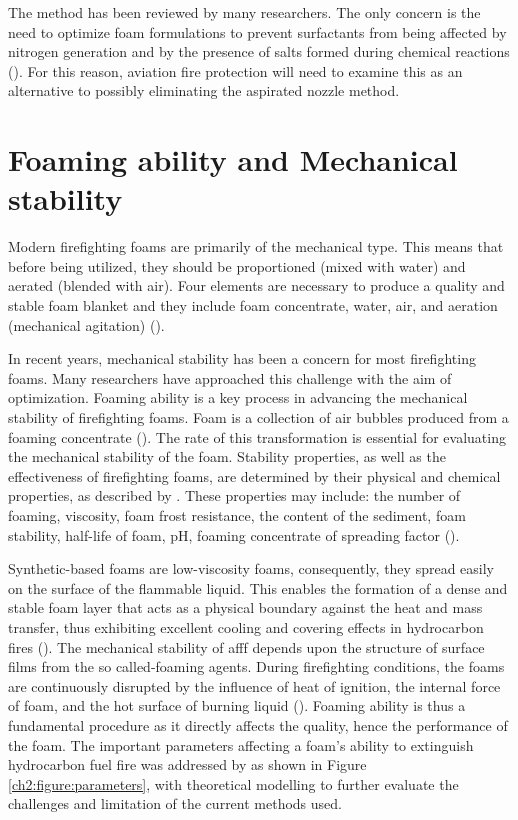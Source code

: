 The method has been reviewed by many researchers.  The only concern is the need to optimize foam formulations to prevent surfactants from being affected by nitrogen generation and by the presence of salts formed during chemical reactions (\cite{laundess2012suppression}).  For this reason, aviation fire protection will need to examine this as an alternative to possibly eliminating the aspirated nozzle method.

\section{Foaming ability and Mechanical stability}
Modern firefighting foams are primarily of the mechanical type. This means that before being utilized, they should be proportioned (mixed with water) and aerated (blended with air). Four elements are necessary to produce a quality and stable foam blanket and they include foam concentrate, water, air, and aeration (mechanical agitation) (\cite{oguike2013study}). 

In recent years, mechanical stability has been a concern for most firefighting foams. Many researchers have approached this challenge with the aim of optimization. Foaming ability is a key process in advancing the mechanical stability of firefighting foams. Foam is a collection of air bubbles produced from a foaming concentrate  (\cite{oguike2013study}). The rate of this transformation is essential for evaluating the mechanical stability of the foam. Stability properties, as well as the effectiveness of firefighting foams, are determined by their physical and chemical properties, as described by \cite{turekova2011environmental}. These properties may include: the number of foaming, viscosity, foam frost resistance, the content of the sediment, foam stability, half-life of foam, pH, foaming concentrate of spreading factor (\cite{turekova2011environmental}). 

Synthetic-based foams are low-viscosity foams, consequently, they spread easily on the surface of the flammable liquid. This enables the formation of a dense and stable foam layer that acts as a physical boundary against the heat and mass transfer, thus exhibiting excellent cooling and covering effects in hydrocarbon fires (\cite{xu2020fire}). The mechanical stability of \acrshort{afff} depends upon the structure of surface films from the so called-foaming agents. During firefighting conditions, the foams are continuously disrupted by the influence of heat of ignition, the internal force of foam, and the hot surface of burning liquid (\cite{turekova2011environmental}). Foaming ability is thus a fundamental procedure as it directly affects the quality, hence the performance of the foam. The important parameters affecting a foam's ability to extinguish hydrocarbon fuel fire was addressed by \cite{scheffey1995evaluating} as shown in Figure \ref{ch2:figure:parameters}, with theoretical modelling to further evaluate the challenges and limitation of the current methods used. 

